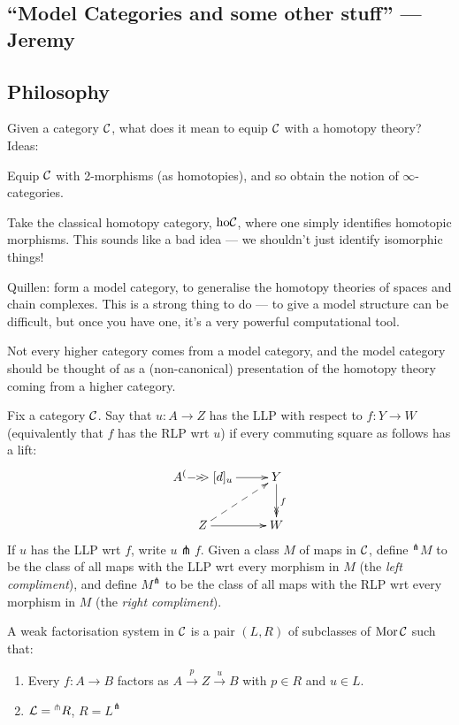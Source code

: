 \documentclass[11pt]{article}
\newcommand{\KanSemResponse}[1]
{
\thispagestyle{fancy}
\subsection*{#1}
}
\begin{document}
\begin{JeremyModelCategories}
\KanSemResponse
{``Model Categories and some other stuff'' --- Jeremy}
\subsection*{Philosophy}
Given a category $\mathcal{C}$, what does it mean to equip $\mathcal{C}$ with a homotopy theory? Ideas:

\begin{itemise}
\item Equip $\mathcal{C}$ with 2-morphisms (as homotopies), and so obtain the notion of $\infty$-categories.
\item Take the classical homotopy category, $\textup{ho}\mathcal{C}$, where one simply identifies homotopic morphisms. This sounds like a bad idea --- we shouldn't just identify isomorphic things!
\item Quillen: form a model category, to generalise the homotopy theories of spaces and chain complexes. This is a strong thing to do --- to give a model structure can be difficult, but once you have one, it's a very powerful computational tool.
\end{itemise}
Not every higher category comes from a model category, and the model category should be thought of as a (non-canonical) presentation of the homotopy theory coming from a higher category.
\begin{defn*}
Fix a category $\mathcal{C}$. Say that $u:A\to Z$ has the LLP with respect to $f:Y\to W$ (equivalently that $f$ has the RLP wrt $u$) if every commuting square as follows has a lift:
\[\xymatrix{
A\ar[r]\xycofib[d]_u&Y\ar@{->>}[d]^f\\
Z\ar@{-->}[ru]\ar[r]&W
}\]
If $u$ has the LLP wrt $f$, write $u\pitchfork f$. Given a class $M$ of maps in $\mathcal{C}$, define $^\pitchfork M$ to be the class of all maps with the LLP wrt every morphism in $M$ (the \emph{left compliment}), and define $ M^\pitchfork$ to be the class of all maps with the RLP wrt every morphism in $M$ (the \emph{right compliment}).
\end{defn*}
\begin{defn*}
A weak factorisation system in $\mathcal{C}$ is a pair $(L,R)$ of subclasses of $\operatorname{Mor}\mathcal{C}$ such that:
\begin{enumerate}\squishlist
\item Every $f:A\to B$ factors as $A\overset{p}{\to} Z\overset{u}{\to} B$ with $p\in R$ and $u\in L$.
\item $\mathcal{L}={^\pitchfork R}$, $R=L^\pitchfork$
\end{enumerate}

\end{defn*}
\end{JeremyModelCategories}
\end{document}
